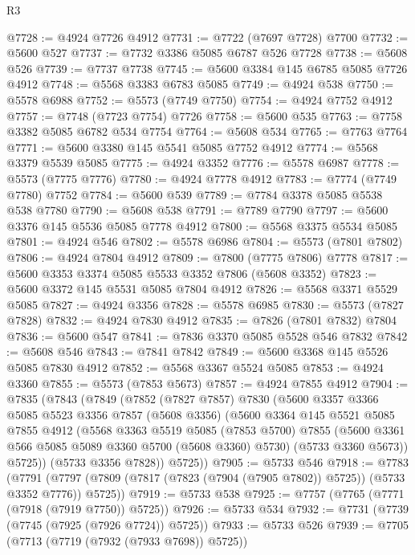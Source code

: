 \begin{lexlean}{R3}
\begin{coremodule}
@7728 := @4924 @7726 @4912
@7731 := @7722 (@7697 @7728) @7700
@7732 := @5600 @527
@7737 := @7732 @3386 @5085 @6787 @526 @7728
@7738 := @5608 @526
@7739 := @7737 @7738
@7745 := @5600 @3384 @145 @6785 @5085 @7726 @4912
@7748 := @5568 @3383 @6783 @5085
@7749 := @4924 @538
@7750 := @5578 @6988
@7752 := @5573 (@7749 @7750)
@7754 := @4924 @7752 @4912
@7757 := @7748 (@7723 @7754) @7726
@7758 := @5600 @535
@7763 := @7758 @3382 @5085 @6782 @534 @7754
@7764 := @5608 @534
@7765 := @7763 @7764
@7771 := @5600 @3380 @145 @5541 @5085 @7752 @4912
@7774 := @5568 @3379 @5539 @5085
@7775 := @4924 @3352
@7776 := @5578 @6987
@7778 := @5573 (@7775 @7776)
@7780 := @4924 @7778 @4912
@7783 := @7774 (@7749 @7780) @7752
@7784 := @5600 @539
@7789 := @7784 @3378 @5085 @5538 @538 @7780
@7790 := @5608 @538
@7791 := @7789 @7790
@7797 := @5600 @3376 @145 @5536 @5085 @7778 @4912
@7800 := @5568 @3375 @5534 @5085
@7801 := @4924 @546
@7802 := @5578 @6986
@7804 := @5573 (@7801 @7802)
@7806 := @4924 @7804 @4912
@7809 := @7800 (@7775 @7806) @7778
@7817 := @5600 @3353 @3374 @5085 @5533 @3352 @7806 (@5608 @3352)
@7823 := @5600 @3372 @145 @5531 @5085 @7804 @4912
@7826 := @5568 @3371 @5529 @5085
@7827 := @4924 @3356
@7828 := @5578 @6985
@7830 := @5573 (@7827 @7828)
@7832 := @4924 @7830 @4912
@7835 := @7826 (@7801 @7832) @7804
@7836 := @5600 @547
@7841 := @7836 @3370 @5085 @5528 @546 @7832
@7842 := @5608 @546
@7843 := @7841 @7842
@7849 := @5600 @3368 @145 @5526 @5085 @7830 @4912
@7852 := @5568 @3367 @5524 @5085
@7853 := @4924 @3360
@7855 := @5573 (@7853 @5673)
@7857 := @4924 @7855 @4912
@7904 := @7835
    (@7843
      (@7849
        (@7852
          (@7827 @7857)
          @7830
          (@5600
            @3357
            @3366
            @5085
            @5523
            @3356
            @7857
            (@5608 @3356)
            (@5600
              @3364
              @145
              @5521
              @5085
              @7855
              @4912
              (@5568
                @3363
                @5519
                @5085
                (@7853 @5700)
                @7855
                (@5600 @3361 @566 @5085 @5089 @3360 @5700 (@5608 @3360) @5730)
                (@5733 @3360 @5673))
              @5725))
          (@5733 @3356 @7828))
        @5725))
@7905 := @5733 @546
@7918 := @7783
    (@7791 (@7797 (@7809 (@7817 (@7823 (@7904 (@7905 @7802)) @5725)) (@5733 @3352 @7776)) @5725))
@7919 := @5733 @538
@7925 := @7757 (@7765 (@7771 (@7918 (@7919 @7750)) @5725))
@7926 := @5733 @534
@7932 := @7731 (@7739 (@7745 (@7925 (@7926 @7724)) @5725))
@7933 := @5733 @526
@7939 := @7705 (@7713 (@7719 (@7932 (@7933 @7698)) @5725))

\end{coremodule}
\end{lexlean}
